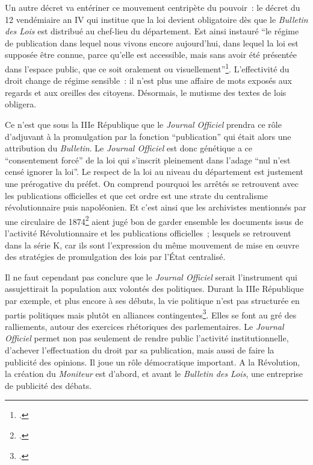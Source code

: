 Un autre décret va entériner ce mouvement centripète du pouvoir : le décret du 12 vendémiaire an IV qui institue que la loi devient obligatoire dès que le \emph{Bulletin des Lois} est distribué au chef-lieu du département. Est ainsi instauré \enquote{le régime de publication dans lequel nous vivons encore aujourd’hui, dans  lequel la loi est supposée être connue, parce qu’elle est accessible, mais sans avoir été présentée dans l’espace public, que ce soit oralement ou visuellement}\footcite[][]{graber}. L’effectivité du droit change de régime sensible : il n’est plus une affaire de mots exposés aux regards  et aux oreilles des citoyens. Désormais, le mutisme des textes de lois obligera.

Ce n’est que sous la IIIe République que le \emph{Journal Officiel} prendra ce rôle d’adjuvant à la promulgation par la fonction \enquote{publication} qui était alors une attribution du \emph{Bulletin}. Le \emph{Journal Officiel} est donc génétique a ce \enquote{consentement forcé} de la loi qui s’inscrit pleinement dans l’adage \enquote{nul n’est censé ignorer la loi}. Le respect de la loi au niveau du département est justement une prérogative du préfet. On comprend pourquoi  les arrêtés se retrouvent avec les publications officielles et que cet ordre est une strate du centralisme révolutionnaire puis napoléonien. Et c’est ainsi que les archivistes mentionnés par une circulaire de 1874\footcite[][]{circulaire} aient jugé bon de garder ensemble les documents issus de l’activité Révolutionnaire et les publications officielles ; lesquels se retrouvent dans la série K, car ils sont l’expression du même mouvement de mise en œuvre des stratégies de promulgation des lois par l’État centralisé.

Il ne faut cependant pas conclure que le \emph{Journal Officiel} serait l’instrument qui assujettirait la population aux volontés des politiques. Durant la IIIe République par exemple, et plus encore à ses débuts, la vie politique n’est pas structurée en partis politiques mais plutôt en alliances contingentes\footcite[][]{morel}. Elles se font au gré des ralliements, autour des exercices rhétoriques des parlementaires. Le \emph{Journal Officiel} permet non pas seulement de rendre public l’activité institutionnelle, d’achever l’effectuation du droit par sa publication, mais aussi de faire la publicité des opinions. Il joue un rôle démocratique important. A la Révolution, la création du \emph{Moniteur} est d’abord, et avant le \emph{Bulletin des Lois}, une entreprise de publicité des débats.

